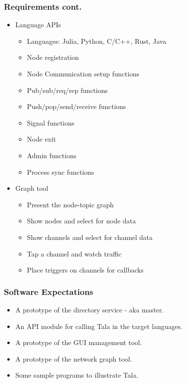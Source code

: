 \documentclass[xcolor=svgnames]{beamer}
\begin{document}
\begin{frame}[fragile]
  \frametitle{Requirements cont.}

\begin{itemize}
\item Language APIs
\begin{itemize}
\item Languages: Julia, Python, C/C++, Rust, Java
\item Node registration 
\item Node Communication setup functions
\item Pub/sub/req/rep  functions
\item Push/pop/send/receive functions
\item Signal functions
\item Node exit
\item Admin functions
\item Process sync functions
\end{itemize}

\item Graph tool
\begin{itemize}
\item Present the node-topic graph
\item Show nodes and select for node data
\item Show channels and select for channel data
\item Tap a channel and watch traffic
\item Place triggers on channels for callbacks
\end{itemize}
\end{itemize}
\end{frame}




\begin{frame}[fragile]
  \frametitle{Software Expectations}

\begin{itemize}
\item A prototype of the directory service - aka master.
\item An  API module for calling Tala in the target languages.
\item A prototype of the GUI management tool.
\item A prototype of the network graph tool.
\item Some sample programs to illustrate Tala.
\end{itemize}


\end{frame}
\end{document}
